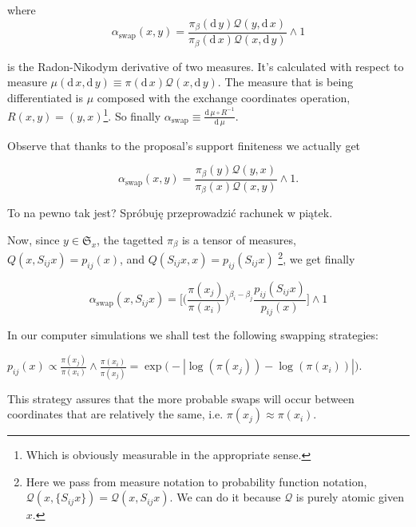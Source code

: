 	where 
$$\alpha_\text{swap}(x,y) = \frac{\pi_\beta( \mathrm{d}\, y ) \mathcal{Q}(y, \mathrm{d}\,x)}{\pi_\beta( \mathrm{d}\, x ) \mathcal{Q}(x, \mathrm{d}\,y)} \wedge 1$$

 is the Radon-Nikodym derivative of two measures. It's calculated with respect to measure $ \mu (\mathrm{d}\,x, \mathrm{d}\,y) \equiv \pi(\mathrm{d}\,x) \mathcal{Q}(x, \mathrm{d}\,y)$. The measure that is being differentiated is $\mu$ composed with the exchange coordinates operation, $R(x,y) = (y,x)$\footnote{Which is obviously measurable in the appropriate sense.}. So finally $\alpha_\text{swap} \equiv \frac{\mathrm{d}\, \mu \circ R^{-1}}{\mathrm{d}\, \mu}$.
	
	Observe that thanks to the proposal's support finiteness we actually get 
	
$$\alpha_\text{swap}(x,y) =  \frac{\pi_\beta( y ) \mathcal{Q}(y, x)}{\pi_\beta( x ) \mathcal{Q}(x, y)} \wedge 1.$$


\begin{questions}[resume]
	\item To na pewno tak jest? Spróbuję przeprowadzić rachunek w piątek.
\end{questions}

	Now, since $y \in \mathfrak{S}_x $, the tagetted $\pi_\beta$ is a tensor of measures, $Q(x, S_{ij} x) = p_{ij}(x)$, and $Q( S_{ij} x, x) = p_{ij}(S_{ij}x)$ \footnote{Here we pass from measure notation to probability function notation, $\mathcal{Q}(x, \{S_{ij}x \}) = \mathcal{Q}(x, S_{ij}x)$. We can do it because $\mathcal{Q}$ is purely atomic given $x$.}, we get finally 

\begin{equation*}
	\alpha_\text{swap}(x,S_{ij} x) = \Big[  \Big(\frac{\pi(x_j)}{\pi(x_i)} \Big)^{\beta_i - \beta_j}  \frac{ p_{ij}(S_{ij} x )}{ p_{ij}( x ) }\Big] \wedge 1
\end{equation*}	
	
	In our computer simulations we shall test the following swapping strategies:
	
\begin{strategy}
	\item $p_{ij}(x) \propto \frac{\pi (x_j)}{\pi( x_i )} \wedge \frac{\pi (x_i)}{\pi( x_j )} = \exp \Big( - | \log ( \pi(x_j) ) - \log ( \pi(x_i) ) | \Big).$ 
\end{strategy}

	This strategy assures that the more probable swaps will occur between coordinates that are relatively the same, i.e. $\pi (x_j) \approx \pi (x_i)$. 
	
